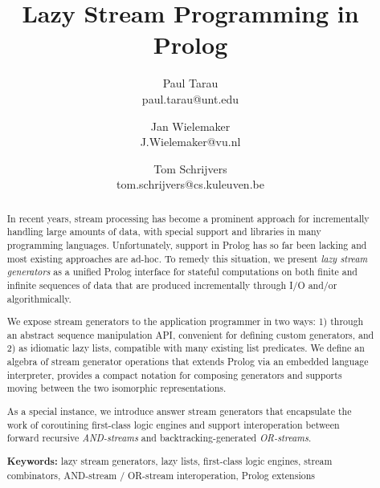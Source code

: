 \documentclass{new_tlp}
\begin{document}

\title{Lazy Stream Programming in Prolog}

\author[Paul Tarau, Jan Wielemaker and Tom Schrijvers]
          {    Paul Tarau\\
          { paul.tarau@unt.edu}
          \and
          Jan Wielemaker\\
          { J.Wielemaker@vu.nl}
          \and
          Tom Schrijvers\\
          { tom.schrijvers@cs.kuleuven.be}
}          

\maketitle



\begin{abstract}
In recent years, stream processing has become a prominent approach for incrementally handling large amounts of data, with special support and libraries in many programming languages. Unfortunately, support in Prolog has so far been lacking and most existing approaches are ad-hoc. To remedy this situation, we present {\em lazy stream generators} as a unified Prolog interface for stateful computations on both finite and infinite sequences of data that are produced incrementally through I/O and/or algorithmically.

We expose stream generators to the application programmer in two ways: 1) through an abstract sequence manipulation API, convenient for defining custom generators, and 2) as idiomatic lazy lists, compatible with many existing list predicates.  We define an algebra of stream generator operations that extends Prolog via an embedded language interpreter, provides a compact notation for composing generators and supports moving between the two isomorphic representations.

As a special instance, we introduce answer stream generators that encapsulate the work of coroutining first-class logic engines and support interoperation between forward recursive {\em AND-streams} and backtracking-generated {\em OR-streams}. 

{\bf Keywords:}
lazy stream generators,
lazy lists,
first-class logic engines,
stream combinators,
AND-stream / OR-stream interoperation,
Prolog extensions

\end{abstract}
\end{document}
